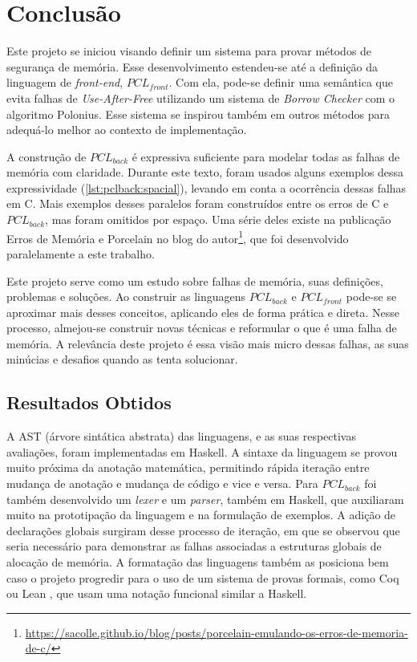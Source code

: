 \chapter{Conclusão}
\label{chap7}

Este projeto se iniciou visando definir um sistema para provar métodos de segurança de memória. Esse desenvolvimento estendeu-se até a definição da linguagem de \emph{front-end}, $PCL_{front}$. Com ela, pode-se definir uma semântica que evita falhas de \emph{Use-After-Free} utilizando um sistema de \emph{Borrow Checker} com o algoritmo Polonius. Esse sistema se inspirou também em outros métodos para adequá-lo melhor ao contexto de implementação.

A construção de $PCL_{back}$ é expressiva suficiente para modelar todas as falhas de memória com claridade. Durante este texto, foram usados alguns exemplos dessa expressividade (\ref{lst:pclback:spacial}), levando em conta a ocorrência dessas falhas em C. Mais exemplos desses paralelos foram construídos entre os erros de C e $PCL_{back}$, mas foram omitidos por espaço. Uma série deles existe na publicação Erros de Memória e Porcelain no blog do autor\footnote{\url{https://sacolle.github.io/blog/posts/porcelain-emulando-os-erros-de-memoria-de-c/}}, que foi desenvolvido paralelamente a este trabalho.

Este projeto serve como um estudo sobre falhas de memória, suas definições, problemas e soluções. Ao construir as linguagens $PCL_{back}$ e $PCL_{front}$ pode-se se aproximar mais desses conceitos, aplicando eles de forma prática e direta. Nesse processo, almejou-se construir novas técnicas e reformular o que é uma falha de memória. A relevância deste projeto é essa visão mais micro dessas falhas, as suas minúcias e desafios quando as tenta solucionar.

\section{Resultados Obtidos}

A AST (árvore sintática abstrata) das linguagens, e as suas respectivas avaliações, foram implementadas em Haskell. A sintaxe da linguagem se provou muito próxima da anotação matemática, permitindo rápida iteração entre mudança de anotação e mudança de código e vice e versa. Para $PCL_{back}$ foi também desenvolvido um \emph{lexer} e um \emph{parser}, também em Haskell, que auxiliaram muito na prototipação da linguagem e na formulação de exemplos. A adição de declarações globais surgiram desse processo de iteração, em que se observou que seria necessário para demonstrar as falhas associadas a estruturas globais de alocação de memória. A formatação das linguagens também as posiciona bem caso o projeto progredir para o uso de um sistema de provas formais, como Coq \cite{COQ} ou Lean \cite{LEAN4}, que usam uma notação funcional similar a Haskell.
